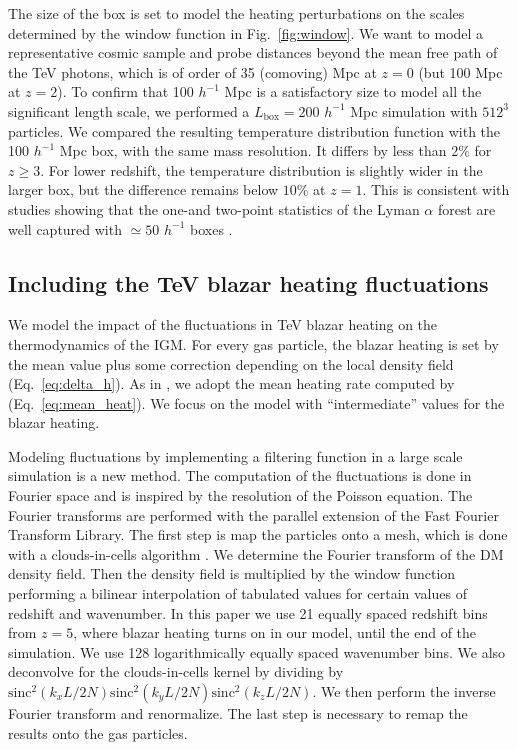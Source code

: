 \documentclass[numberedappendix]{emulateapj}
\begin{document}
The size of the box is set to model the heating perturbations on the scales determined by the window function in Fig.~\ref{fig:window}. We want to model a representative cosmic sample and probe distances beyond the mean free path of the TeV photons, which is of order of 35 (comoving) Mpc at $z=0$ (but 100 Mpc at $z=2$). To confirm that 100 $h^{-1}$ Mpc is a satisfactory size to model all the significant length scale, we performed a $L_\mathrm{box}=200 $ $h^{-1}$ Mpc simulation with $512^3$ particles. We compared the resulting temperature distribution function with the 100 $h^{-1}$ Mpc box, with the same mass resolution. It differs by less than $2\%$ for $z\geqslant 3$. For lower redshift, the temperature distribution is slightly wider in the larger box, but the difference remains below $10\%$ at $z=1$. This is consistent with studies showing that the one-and two-point statistics of the Lyman $\alpha$ forest are well captured with $\simeq 50$ $h^{-1}$ boxes \citep{2007MNRAS.374..196R,2009MNRAS.398L..26B}.
\subsection{Including the TeV blazar heating fluctuations}
We model the impact of the fluctuations in TeV blazar heating on the thermodynamics of the IGM. For every gas particle, the blazar heating is set by the mean value plus some correction depending on the local density field (Eq.~\eqref{eq:delta_h}). As in \citet{2012MNRAS.423..149P}, we adopt the mean heating rate computed by \citet{2012ApJ...752...23C} (Eq.~\eqref{eq:mean_heat}). We focus on the model with ``intermediate'' values for the blazar heating.

Modeling fluctuations by implementing a filtering function in a large scale simulation is a new method. The computation of the fluctuations is done in Fourier space and is inspired by the resolution of the Poisson equation. The Fourier transforms are performed with the parallel extension of the Fast Fourier Transform Library. The first step is map the particles onto a mesh, which is done with a clouds-in-cells algorithm \citep{1981csup.book.....H}. We determine the Fourier transform of the DM density field. Then the density field is multiplied by the window function performing a bilinear interpolation of tabulated values for certain values of redshift and wavenumber. In this paper we use 21 equally spaced redshift bins from $z=5$, where blazar heating turns on in our model, until the end of the simulation. We use 128 logarithmically equally spaced wavenumber bins. We also deconvolve for the clouds-in-cells kernel by dividing by $\mathrm{sinc}^2(k_x L/2N)\mathrm{sinc}^2(k_y L/2N)\mathrm{sinc}^2(k_z L/2N)$. We then perform the inverse Fourier transform and renormalize. The last step is necessary to remap the results onto the gas particles.
\end{document}
